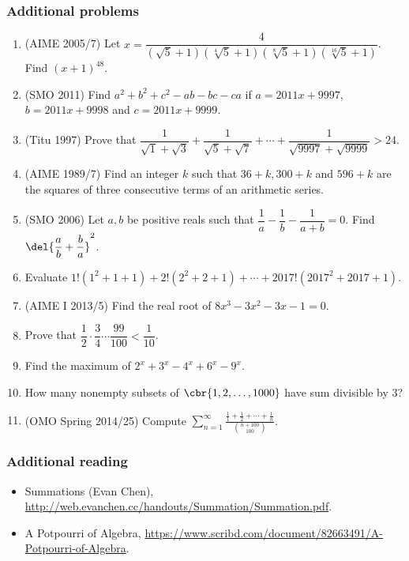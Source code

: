 \documentclass[10pt,paper=letter]{scrartcl}
\begin{document}
\subsubsection*{Additional problems}

\begin{enumerate}
  \item (AIME 2005/7) Let $x = \dfrac4{(\sqrt5+1)(\sqrt[4]5+1)(\sqrt[8]5+1)(\sqrt[16]5+1)}$. Find $(x+1)^{48}$.
  \item (SMO 2011) Find $a^2 + b^2 + c^2 - ab - bc - ca$ if $a = 2011x + 9997$, $b = 2011x + 9998$ and $c = 2011x + 9999$. 
  \item (Titu 1997) Prove that $\dfrac1{\sqrt1+\sqrt3} + \dfrac1{\sqrt5+\sqrt7} + \cdots + \dfrac1{\sqrt{9997}+\sqrt{9999}} > 24$.
  \item (AIME 1989/7) Find an integer $k$ such that $36+k, 300+k$ and $596+k$ are the squares of three consecutive terms of an arithmetic series.
  \item (SMO 2006) Let $a, b$ be positive reals such that $\dfrac1a - \dfrac1b - \dfrac1{a+b} = 0$. Find $\del{\dfrac{a}b + \dfrac{b}a}^2$.
  \item Evaluate $1!(1^2 + 1 + 1) + 2!(2^2 + 2 + 1) + \cdots + 2017!(2017^2 + 2017 + 1)$.
  \item (AIME I 2013/5) Find the real root of $8x^3 - 3x^2 - 3x - 1 = 0$.
  \item Prove that $\dfrac12 \cdot \dfrac34 \cdots \dfrac{99}{100} < \dfrac1{10}$.
  \item Find the maximum of $2^x + 3^x - 4^x + 6^x - 9^x$.
  \item How many nonempty subsets of $\cbr{1, 2, \ldots, 1000}$ have sum divisible by $3$?
  \item (OMO Spring 2014/25) Compute $\displaystyle \sum_{n=1}^{\infty} \frac{\frac11 + \frac12 + \cdots + \frac1n}{\binom{n+100}{100}}$.
\end{enumerate}

\subsubsection*{Additional reading}

\begin{itemize}
  \item Summations (Evan Chen), \url{http://web.evanchen.cc/handouts/Summation/Summation.pdf}.

  \item A Potpourri of Algebra, \url{https://www.scribd.com/document/82663491/A-Potpourri-of-Algebra}.
\end{itemize}
\end{document}
